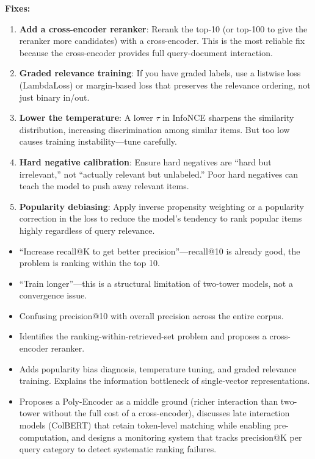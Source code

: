\begin{interviewq}
\textbf{Fixes:}
\begin{enumerate}
    \item \textbf{Add a cross-encoder reranker}: Rerank the top-10 (or top-100 to give the reranker more candidates) with a cross-encoder. This is the most reliable fix because the cross-encoder provides full query-document interaction.
    \item \textbf{Graded relevance training}: If you have graded labels, use a listwise loss (LambdaLoss) or margin-based loss that preserves the relevance ordering, not just binary in/out.
    \item \textbf{Lower the temperature}: A lower $\tau$ in InfoNCE sharpens the similarity distribution, increasing discrimination among similar items. But too low causes training instability---tune carefully.
    \item \textbf{Hard negative calibration}: Ensure hard negatives are ``hard but irrelevant,'' not ``actually relevant but unlabeled.'' Poor hard negatives can teach the model to push away relevant items.
    \item \textbf{Popularity debiasing}: Apply inverse propensity weighting or a popularity correction in the loss to reduce the model's tendency to rank popular items highly regardless of query relevance.
\end{enumerate}

\redflags
\begin{itemize}
    \item ``Increase recall@K to get better precision''---recall@10 is already good, the problem is ranking within the top 10.
    \item ``Train longer''---this is a structural limitation of two-tower models, not a convergence issue.
    \item Confusing precision@10 with overall precision across the entire corpus.
\end{itemize}


\goodgreat
\begin{itemize}
    \item {} Identifies the ranking-within-retrieved-set problem and proposes a cross-encoder reranker.
    \item {} Adds popularity bias diagnosis, temperature tuning, and graded relevance training. Explains the information bottleneck of single-vector representations.
    \item {} Proposes a Poly-Encoder as a middle ground (richer interaction than two-tower without the full cost of a cross-encoder), discusses late interaction models (ColBERT) that retain token-level matching while enabling pre-computation, and designs a monitoring system that tracks precision@K per query category to detect systematic ranking failures.
\end{itemize}


\end{interviewq}
